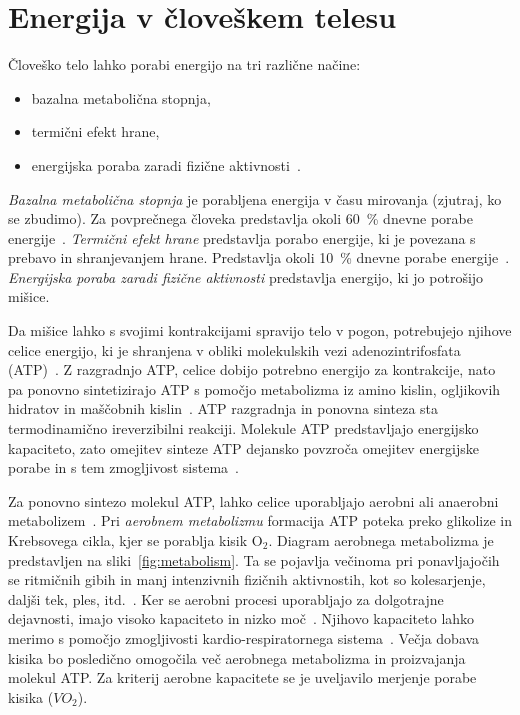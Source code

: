 \section{Energija v človeškem telesu}\label{sec:energija}
Človeško telo lahko porabi energijo na tri različne načine:

\begin{itemize}
\item bazalna metabolična stopnja,
\item termični efekt hrane,
\item energijska poraba zaradi fizične aktivnosti~\cite{levine2005measurement}.
\end{itemize}

\emph{Bazalna metabolična stopnja} je porabljena energija v času mirovanja (zjutraj, ko se zbudimo). Za povprečnega človeka predstavlja okoli \SI{60}{\%} dnevne porabe energije~\cite{levine2005measurement}. \emph{Termični efekt hrane} predstavlja porabo energije, ki je povezana s prebavo in shranjevanjem hrane. Predstavlja okoli \SI{10}{\%} dnevne porabe energije~\cite{levine2005measurement}. \emph{Energijska poraba zaradi fizične aktivnosti} predstavlja energijo, ki jo potrošijo mišice. 

Da mišice lahko s svojimi kontrakcijami spravijo telo v pogon, potrebujejo njihove celice energijo, ki je shranjena v obliki molekulskih vezi adenozintrifosfata (ATP)~\cite{scott2005misconceptions}. Z razgradnjo ATP, celice dobijo potrebno energijo za kontrakcije, nato pa ponovno sintetizirajo ATP s pomočjo metabolizma iz amino kislin, ogljikovih hidratov in maščobnih kislin~\cite{scott2005misconceptions,patel2017aerobic}. ATP razgradnja in ponovna sinteza sta termodinamično ireverzibilni reakciji. Molekule ATP predstavljajo energijsko kapaciteto, zato omejitev sinteze ATP dejansko povzroča omejitev energijske porabe in s tem zmogljivost sistema~\cite{sahlin1998energy}.

Za ponovno sintezo molekul ATP, lahko celice uporabljajo aerobni ali anaerobni metabolizem~\cite{scott2005misconceptions}. Pri \emph{aerobnem metabolizmu} formacija ATP poteka preko glikolize in Krebsovega cikla, kjer se porablja kisik $\mathrm{O}_2$. Diagram aerobnega metabolizma je predstavljen na sliki~\ref{fig:metabolism}. Ta se pojavlja večinoma pri ponavljajočih se ritmičnih gibih in manj intenzivnih fizičnih aktivnostih, kot so kolesarjenje, daljši tek, ples, itd.~\cite{patel2017aerobic}. Ker se aerobni procesi uporabljajo za dolgotrajne dejavnosti, imajo visoko kapaciteto in nizko moč~\cite{sahlin1998energy}. Njihovo kapaciteto lahko merimo s pomočjo zmogljivosti kardio-respiratornega sistema~\cite{patel2017aerobic}. Večja dobava kisika bo posledično omogočila več aerobnega metabolizma in proizvajanja molekul ATP. Za kriterij aerobne kapacitete se je uveljavilo merjenje porabe kisika (${VO}_2$).

